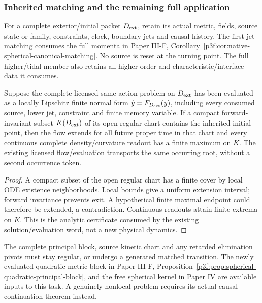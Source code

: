 \documentclass[12pt,a4paper]{article}
\begin{document}
\subsubsection{Inherited matching and the remaining full application}
For a complete exterior/initial packet \(D_{\rm ext}\), retain its actual
metric, fields, source state or family, constraints, clock, boundary jets and
causal history. The first-jet matching consumes the full momenta in Paper
III-F, Corollary~\ref{p3f:cor:native-spherical-canonical-matching}.
No source is reset at the turning point. The full higher/tidal member also
retains all higher-order and characteristic/interface data it consumes.

\begin{proposition}
\label{p8:prop:regular-finite-continuation-criterion}
Suppose the complete licensed same-action problem on \(D_{\rm ext}\) has
been evaluated as a locally Lipschitz finite normal form
\(\dot y=F_{D_{\rm ext}}(y)\), including every consumed source, lower jet,
constraint and finite memory variable. If a compact forward-invariant subset
\(K(D_{\rm ext})\) of its open regular chart contains the inherited initial
point, then the flow extends for all future proper time in that chart and
every continuous complete density/curvature readout has a finite maximum on
\(K\). The existing licensed flow/evaluation transports the same occurring
root, without a second occurrence token.
\end{proposition}
\begin{proof}
A compact subset of the open regular chart has a finite cover by local ODE
existence neighborhoods. Local bounds give a uniform extension interval;
forward invariance prevents exit. A hypothetical finite maximal endpoint
could therefore be extended, a contradiction. Continuous readouts attain
finite extrema on \(K\). This is the analytic certificate consumed by the
existing solution/evaluation word, not a new physical dynamics.
\end{proof}

The complete principal block, source kinetic chart and any retarded
elimination pivots must stay regular, or undergo a generated matched
transition. The newly evaluated quadratic metric block in Paper III-F,
Proposition~\ref{p3f:prop:spherical-quadratic-principal-block}, and the free
spherical kernel in Paper IV are available inputs to this task. A genuinely
nonlocal problem requires its actual causal continuation theorem instead.
\end{document}
